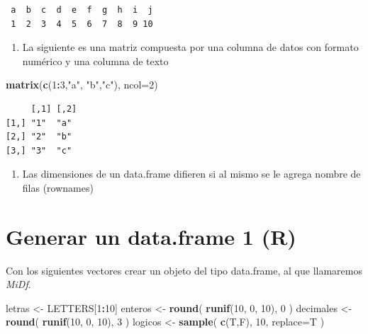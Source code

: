 \documentclass[]{book}
\newenvironment{Shaded}{\begin{snugshade}}{\end{snugshade}}
\newcommand{\DataTypeTok}[1]{\textcolor[rgb]{0.13,0.29,0.53}{#1}}
\newcommand{\DecValTok}[1]{\textcolor[rgb]{0.00,0.00,0.81}{#1}}
\newcommand{\KeywordTok}[1]{\textcolor[rgb]{0.13,0.29,0.53}{\textbf{#1}}}
\newcommand{\NormalTok}[1]{#1}
\newcommand{\OperatorTok}[1]{\textcolor[rgb]{0.81,0.36,0.00}{\textbf{#1}}}
\newcommand{\StringTok}[1]{\textcolor[rgb]{0.31,0.60,0.02}{#1}}
\providecommand{\tightlist}{%
  \setlength{\itemsep}{0pt}\setlength{\parskip}{0pt}}
\begin{document}
\begin{verbatim}
 a  b  c  d  e  f  g  h  i  j 
 1  2  3  4  5  6  7  8  9 10 
\end{verbatim}

\begin{enumerate}
\def\labelenumi{\arabic{enumi}.}
\setcounter{enumi}{8}
\tightlist
\item
  La siguiente es una matriz compuesta por una columna de datos con formato numérico y una columna de texto
\end{enumerate}

\begin{Shaded}
\begin{Highlighting}[]
\KeywordTok{matrix}\NormalTok{(}\KeywordTok{c}\NormalTok{(}\DecValTok{1}\OperatorTok{:}\DecValTok{3}\NormalTok{,}\StringTok{"a"}\NormalTok{, }\StringTok{"b"}\NormalTok{,}\StringTok{"c"}\NormalTok{), }\DataTypeTok{ncol=}\DecValTok{2}\NormalTok{)}
\end{Highlighting}
\end{Shaded}

\begin{verbatim}
     [,1] [,2]
[1,] "1"  "a" 
[2,] "2"  "b" 
[3,] "3"  "c" 
\end{verbatim}

\begin{enumerate}
\def\labelenumi{\arabic{enumi}.}
\setcounter{enumi}{9}
\tightlist
\item
  Las dimensiones de un data.frame difieren si al mismo se le agrega nombre de filas (rownames)
\end{enumerate}

\hypertarget{generar-un-data.frame-1-r}{%
\section{Generar un data.frame 1 (R)}\label{generar-un-data.frame-1-r}}

Con los siguientes vectores crear un objeto del tipo data.frame, al que llamaremos \emph{MiDf}.

\begin{Shaded}
\begin{Highlighting}[]
\NormalTok{letras <-}\StringTok{ }\NormalTok{LETTERS[}\DecValTok{1}\OperatorTok{:}\DecValTok{10}\NormalTok{]  }
\NormalTok{enteros <-}\StringTok{ }\KeywordTok{round}\NormalTok{( }\KeywordTok{runif}\NormalTok{(}\DecValTok{10}\NormalTok{, }\DecValTok{0}\NormalTok{, }\DecValTok{10}\NormalTok{), }\DecValTok{0}\NormalTok{ )  }
\NormalTok{decimales <-}\StringTok{ }\KeywordTok{round}\NormalTok{( }\KeywordTok{runif}\NormalTok{(}\DecValTok{10}\NormalTok{, }\DecValTok{0}\NormalTok{, }\DecValTok{10}\NormalTok{), }\DecValTok{3}\NormalTok{ )  }
\NormalTok{logicos <-}\StringTok{ }\KeywordTok{sample}\NormalTok{( }\KeywordTok{c}\NormalTok{(T,F), }\DecValTok{10}\NormalTok{, }\DataTypeTok{replace=}\NormalTok{T ) }
\end{Highlighting}
\end{Shaded}
\end{document}
